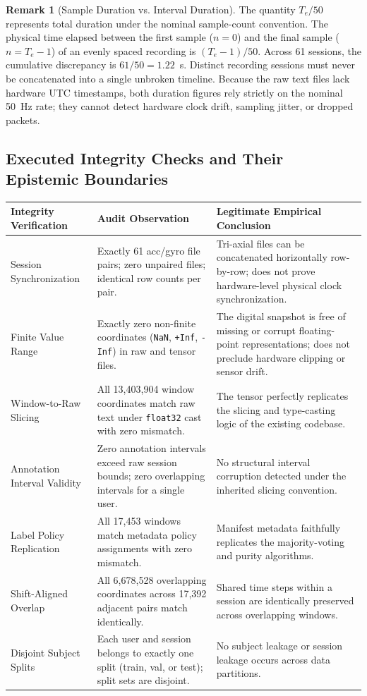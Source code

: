 \documentclass[11pt,a4paper]{article}
\newcommand{\code}[1]{{\small\ttfamily\nolinkurl{#1}}}
\theoremstyle{definition}
\newtheorem{remark}[proposition]{Remark}
\begin{document}
\begin{remark}[Sample Duration vs. Interval Duration]
The quantity $T_e / 50$ represents total duration under the nominal sample-count convention. The physical time elapsed between the first sample ($n=0$) and the final sample ($n=T_e-1$) of an evenly spaced recording is $(T_e - 1) / 50$. Across 61 sessions, the cumulative discrepancy is $61 / 50 = 1.22$~s. Distinct recording sessions must never be concatenated into a single unbroken timeline. Because the raw text files lack hardware UTC timestamps, both duration figures rely strictly on the nominal 50~Hz rate; they cannot detect hardware clock drift, sampling jitter, or dropped packets.
\end{remark}

\subsection{Executed Integrity Checks and Their Epistemic Boundaries}
\begin{longtable}{@{}P{3.4cm}P{3.4cm}P{5.8cm}@{}}\toprule
Integrity Verification & Audit Observation & Legitimate Empirical Conclusion\\\midrule\endhead
Session Synchronization & Exactly 61 acc/gyro file pairs; zero unpaired files; identical row counts per pair. & Tri-axial files can be concatenated horizontally row-by-row; does not prove hardware-level physical clock synchronization.\\
Finite Value Range & Exactly zero non-finite coordinates (\code{NaN}, \code{+Inf}, \code{-Inf}) in raw and tensor files. & The digital snapshot is free of missing or corrupt floating-point representations; does not preclude hardware clipping or sensor drift.\\
Window-to-Raw Slicing & All 13,403,904 window coordinates match raw text under \code{float32} cast with zero mismatch. & The tensor perfectly replicates the slicing and type-casting logic of the existing codebase.\\
Annotation Interval Validity & Zero annotation intervals exceed raw session bounds; zero overlapping intervals for a single user. & No structural interval corruption detected under the inherited slicing convention.\\
Label Policy Replication & All 17,453 windows match metadata policy assignments with zero mismatch. & Manifest metadata faithfully replicates the majority-voting and purity algorithms.\\
Shift-Aligned Overlap & All 6,678,528 overlapping coordinates across 17,392 adjacent pairs match identically. & Shared time steps within a session are identically preserved across overlapping windows.\\
Disjoint Subject Splits & Each user and session belongs to exactly one split (train, val, or test); split sets are disjoint. & No subject leakage or session leakage occurs across data partitions.\\\bottomrule
\end{longtable}
\end{document}
